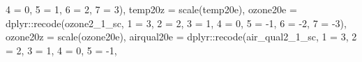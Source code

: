 \documentclass[
]{article}
\newenvironment{Shaded}{\begin{snugshade}}{\end{snugshade}}
\newcommand{\AttributeTok}[1]{\textcolor[rgb]{0.77,0.63,0.00}{#1}}
\newcommand{\DecValTok}[1]{\textcolor[rgb]{0.00,0.00,0.81}{#1}}
\newcommand{\FunctionTok}[1]{\textcolor[rgb]{0.00,0.00,0.00}{#1}}
\newcommand{\NormalTok}[1]{#1}
\newcommand{\OtherTok}[1]{\textcolor[rgb]{0.56,0.35,0.01}{#1}}
\newcommand{\SpecialCharTok}[1]{\textcolor[rgb]{0.00,0.00,0.00}{#1}}
\newcommand{\StringTok}[1]{\textcolor[rgb]{0.31,0.60,0.02}{#1}}
\begin{document}
\begin{Shaded}
\begin{Highlighting}[]
                           \StringTok{\textasciigrave{}}\AttributeTok{4}\StringTok{\textasciigrave{}} \OtherTok{=} \DecValTok{0}\NormalTok{,}
                           \StringTok{\textasciigrave{}}\AttributeTok{5}\StringTok{\textasciigrave{}} \OtherTok{=} \DecValTok{1}\NormalTok{,}
                           \StringTok{\textasciigrave{}}\AttributeTok{6}\StringTok{\textasciigrave{}} \OtherTok{=} \DecValTok{2}\NormalTok{,}
                           \StringTok{\textasciigrave{}}\AttributeTok{7}\StringTok{\textasciigrave{}} \OtherTok{=} \DecValTok{3}\NormalTok{),}
         \AttributeTok{temp20z =} \FunctionTok{scale}\NormalTok{(temp20e),}
         \AttributeTok{ozone20e =}\NormalTok{ dplyr}\SpecialCharTok{::}\FunctionTok{recode}\NormalTok{(ozone2\_1\_sc, }\StringTok{\textasciigrave{}}\AttributeTok{1}\StringTok{\textasciigrave{}} \OtherTok{=} \DecValTok{3}\NormalTok{,}
                           \StringTok{\textasciigrave{}}\AttributeTok{2}\StringTok{\textasciigrave{}} \OtherTok{=} \DecValTok{2}\NormalTok{,}
                           \StringTok{\textasciigrave{}}\AttributeTok{3}\StringTok{\textasciigrave{}} \OtherTok{=} \DecValTok{1}\NormalTok{,}
                           \StringTok{\textasciigrave{}}\AttributeTok{4}\StringTok{\textasciigrave{}} \OtherTok{=} \DecValTok{0}\NormalTok{,   }
                           \StringTok{\textasciigrave{}}\AttributeTok{5}\StringTok{\textasciigrave{}} \OtherTok{=} \SpecialCharTok{{-}}\DecValTok{1}\NormalTok{,}
                           \StringTok{\textasciigrave{}}\AttributeTok{6}\StringTok{\textasciigrave{}} \OtherTok{=} \SpecialCharTok{{-}}\DecValTok{2}\NormalTok{,}
                           \StringTok{\textasciigrave{}}\AttributeTok{7}\StringTok{\textasciigrave{}} \OtherTok{=} \SpecialCharTok{{-}}\DecValTok{3}\NormalTok{),}
         \AttributeTok{ozone20z =} \FunctionTok{scale}\NormalTok{(ozone20e),}
         \AttributeTok{airqual20e =}\NormalTok{ dplyr}\SpecialCharTok{::}\FunctionTok{recode}\NormalTok{(air\_qual2\_1\_sc, }\StringTok{\textasciigrave{}}\AttributeTok{1}\StringTok{\textasciigrave{}} \OtherTok{=} \DecValTok{3}\NormalTok{,}
                           \StringTok{\textasciigrave{}}\AttributeTok{2}\StringTok{\textasciigrave{}} \OtherTok{=} \DecValTok{2}\NormalTok{,}
                           \StringTok{\textasciigrave{}}\AttributeTok{3}\StringTok{\textasciigrave{}} \OtherTok{=} \DecValTok{1}\NormalTok{,}
                           \StringTok{\textasciigrave{}}\AttributeTok{4}\StringTok{\textasciigrave{}} \OtherTok{=} \DecValTok{0}\NormalTok{,}
                           \StringTok{\textasciigrave{}}\AttributeTok{5}\StringTok{\textasciigrave{}} \OtherTok{=} \SpecialCharTok{{-}}\DecValTok{1}\NormalTok{,}

\end{Highlighting}
\end{Shaded}
\end{document}
